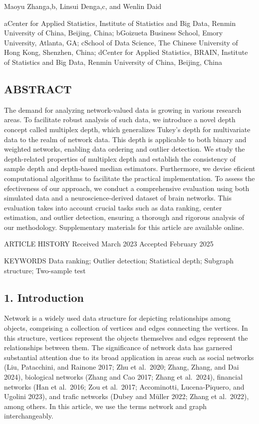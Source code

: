 \documentclass[
  10
]{article}
\newcounter{none} %
\begin{document}
Maoyu Zhanga,b, Linsui Denga,c, and Wenlin Daid

aCenter for Applied Statistics, Institute of Statistics and Big Data,
Renmin University of China, Beijing, China; bGoizueta Business School,
Emory University, Atlanta, GA; cSchool of Data Science, The Chinese
University of Hong Kong, Shenzhen, China; dCenter for Applied
Statistics, BRAIN, Institute of Statistics and Big Data, Renmin
University of China, Beijing, China

\subsection{ABSTRACT}\label{abstract}

The demand for analyzing network-valued data is growing in various
research areas. To facilitate robust analysis of such data, we introduce
a novel depth concept called multiplex depth, which generalizes Tukey's
depth for multivariate data to the realm of network data. This depth is
applicable to both binary and weighted networks, enabling data ordering
and outlier detection. We study the depth-related properties of
multiplex depth and establish the consistency of sample depth and
depth-based median estimators. Furthermore, we devise eficient
computational algorithms to facilitate the practical implementation. To
assess the efectiveness of our approach, we conduct a comprehensive
evaluation using both simulated data and a neuroscience-derived dataset
of brain networks. This evaluation takes into account crucial tasks such
as data ranking, center estimation, and outlier detection, ensuring a
thorough and rigorous analysis of our methodology. Supplementary
materials for this article are available online.

ARTICLE HISTORY Received March 2023 Accepted February 2025

KEYWORDS Data ranking; Outlier detection; Statistical depth; Subgraph
structure; Two-sample test

\subsection{1. Introduction}\label{introduction}

Network is a widely used data structure for depicting relationships
among objects, comprising a collection of vertices and edges connecting
the vertices. In this structure, vertices represent the objects
themselves and edges represent the relationships between them. The
significance of network data has garnered substantial attention due to
its broad application in areas such as social networks (Liu, Patacchini,
and Rainone 2017; Zhu et al.~2020; Zhang, Zhang, and Dai 2024),
biological networks (Zhang and Cao 2017; Zhang et al.~2024), financial
networks (Han et al.~2016; Zou et al.~2017; Accominotti, Lucena-Piquero,
and Ugolini 2023), and trafic networks (Dubey and Müller 2022; Zhang et
al.~2022), among others. In this article, we use the terms network and
graph interchangeably.
\end{document}
